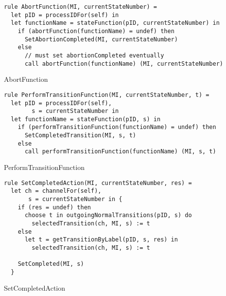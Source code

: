 \begin{listing}[H]
\begin{verbatim}
rule AbortFunction(MI, currentStateNumber) =
  let pID = processIDFor(self) in
  let functionName = stateFunction(pID, currentStateNumber) in
    if (abortFunction(functionName) = undef) then
      SetAbortionCompleted(MI, currentStateNumber)
    else
      // must set abortionCompleted eventually
      call abortFunction(functionName) (MI, currentStateNumber)
\end{verbatim}
\caption{AbortFunction}
\label{lst:asm:AbortFunction}
\end{listing}




\begin{listing}[H]
\begin{verbatim}
rule PerformTransitionFunction(MI, currentStateNumber, t) =
  let pID = processIDFor(self),
        s = currentStateNumber in
  let functionName = stateFunction(pID, s) in
    if (performTransitionFunction(functionName) = undef) then
      SetCompletedTransition(MI, s, t)
    else
      call performTransitionFunction(functionName) (MI, s, t)
\end{verbatim}
\caption{PerformTransitionFunction}
\label{lst:asm:PerformTransitionFunction}
\end{listing}




\begin{listing}[H]
\begin{verbatim}
rule SetCompletedAction(MI, currentStateNumber, res) =
  let ch = channelFor(self),
       s = currentStateNumber in {
    if (res = undef) then
      choose t in outgoingNormalTransitions(pID, s) do
        selectedTransition(ch, MI, s) := t
    else
      let t = getTransitionByLabel(pID, s, res) in
        selectedTransition(ch, MI, s) := t

    SetCompleted(MI, s)
  }
\end{verbatim}
\caption{SetCompletedAction}
\label{lst:asm:SetCompletedAction}
\end{listing}





